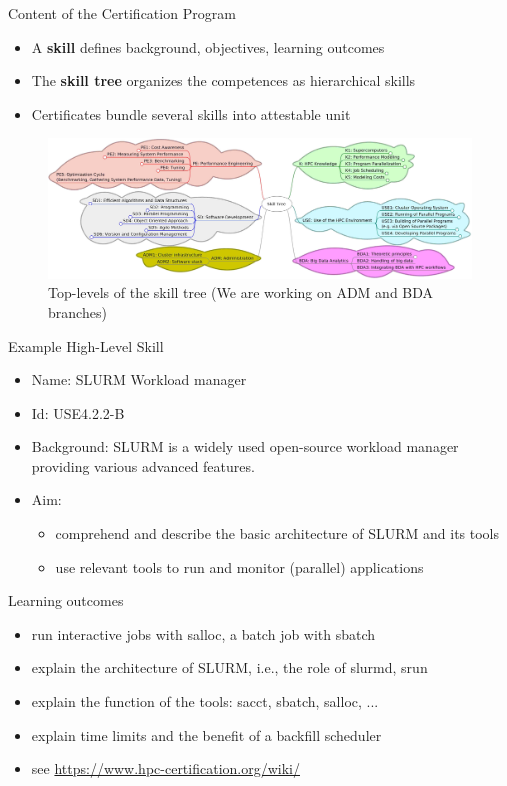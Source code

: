 \documentclass[compress,aspectratio=169]{beamer}
\begin{document}
\begin{frame}{Content of the Certification Program}
	\begin{itemize}
		\item A \textbf{skill} defines background, objectives, learning outcomes
		\item The \textbf{skill tree} organizes the competences as hierarchical skills
		\item Certificates bundle several skills into attestable unit
	\end{itemize}

	\begin{figure}
		\includegraphics[width=\textwidth]{skill-tree}
		\vspace*{-2em}
		\caption{Top-levels of the skill tree (We are working on ADM and BDA branches)}
	\end{figure}
\end{frame}


\begin{frame}{Example High-Level Skill}
\begin{itemize}
\item Name: SLURM Workload manager
\item Id: USE4.2.2-B
\item Background: {\small SLURM is a widely used open-source workload
manager providing various advanced features.}
\item Aim:
\begin{itemize}
\item comprehend and describe the basic architecture of SLURM and its tools
\item use relevant tools to run and monitor (parallel) applications
\end{itemize}
\end{itemize}

\begin{block}{Learning outcomes}
\begin{itemize}
\item run interactive jobs with salloc, a batch job with sbatch
\item explain the architecture of SLURM, i.e., the role of slurmd, srun
\item explain the function of the tools: sacct, sbatch, salloc, ...
\item explain time limits and the benefit of a backfill scheduler
\item see \url{https://www.hpc-certification.org/wiki/}
\end{itemize}
\end{block}
\end{frame}
\end{document}
